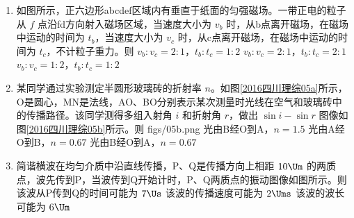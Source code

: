 \documentclass[\gkver]{gaokaozhenti}
\begin{document}
\begin{enumerate}
\item
如图所示，正六边形abcdef区域内有垂直于纸面的匀强磁场。一带正电的粒子从 $f$ 点沿fd方向射入磁场区域，当速度大小为 $v_{b}$ 时，从b点离开磁场，在磁场中运动的时间为 $t_{b}$，当速度大小为 $v_{c}$ 时，从c点离开磁场，在磁场中运动的时间为 $t_{c}$，不计粒子重力。则
\onepicture[w=2.33cm]{}
{$v_{b}:v_{c}=2:1$，$t_{b}:t_{c}=1:2$}
{$v_{b}:v_{c}=2:1$，$t_{b}:t_{c}=2:1$}
{$v_{b}:v_{c}=1:2$，$t_{b}:t_{c}=1:2$}

\item
某同学通过实验测定半圆形玻璃砖的折射率 $n$。如图\ref{2016四川理综05a}所示，O是圆心，MN是法线，AO、BO分别表示某次测量时光线在空气和玻璃砖中的传播路径。该同学测得多组入射角 $i$ 和折射角 $r$，做出 $\sin i-\sin r$ 图像如图\ref{2016四川理综05b}所示。则
{figs/05b.png}
{光由B经O到A，$n=1.5$}
{光由A经O到B，$n=0.67$}
{光由B经O到A，$n=0.67$}

\item
简谐横波在均匀介质中沿直线传播，P、Q是传播方向上相距 $10\Um$ 的两质点，波先传到P，当波传到Q开始计时，P、Q两质点的振动图像如图所示。则
\onepicture[w=3.74cm]{}
{该波从P传到Q的时间可能为 $7\Us$}
{该波的传播速度可能为 $2\Ums$}
{该波的波长可能为 $6\Um$}


\end{enumerate}
\end{document}
